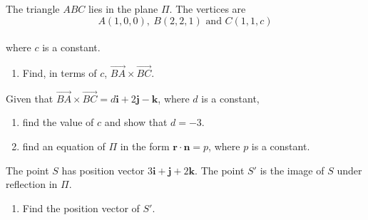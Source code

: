 \documentclass[leqno]{article}
\begin{document}
\begin{enumerate}[
  label=\textbf{\arabic*.},
  leftmargin=*,
  topsep=0pt,
  partopsep=0pt,
  parsep=0pt
]
\newpage

\questionitem

The triangle $ABC$ lies in the plane $\Pi$. The vertices are
\[
A(1,0,0),\ B(2,2,1) \text{ and } C(1,1,c)
\] \\
where $c$ is a constant. \\
\begin{enumerate}[label=\textbf{(\alph*)}]
  \item Find, in terms of $c$, $\overrightarrow{BA}\times\overrightarrow{BC}$.  \\
\end{enumerate}
Given that $\overrightarrow{BA}\times\overrightarrow{BC}=d\mathbf{i}+2\mathbf{j}-\mathbf{k}$, where $d$ is a constant, \\
\begin{enumerate}[label=\textbf{(\alph*)}, resume]
  \item find the value of $c$ and show that $d=-3$.  \\
  \item find an equation of $\Pi$ in the form $\mathbf{r}\cdot\mathbf{n}=p$, where $p$ is a constant.  \\
\end{enumerate}
The point $S$ has position vector $3\mathbf{i}+\mathbf{j}+2\mathbf{k}$. The point $S'$ is the image of $S$ under reflection in $\Pi$. \\
\begin{enumerate}[label=\textbf{(\alph*)}, resume]
  \item Find the position vector of $S'$.  \\
\end{enumerate}

\newpage

\questionitem


\end{enumerate}
\end{document}
